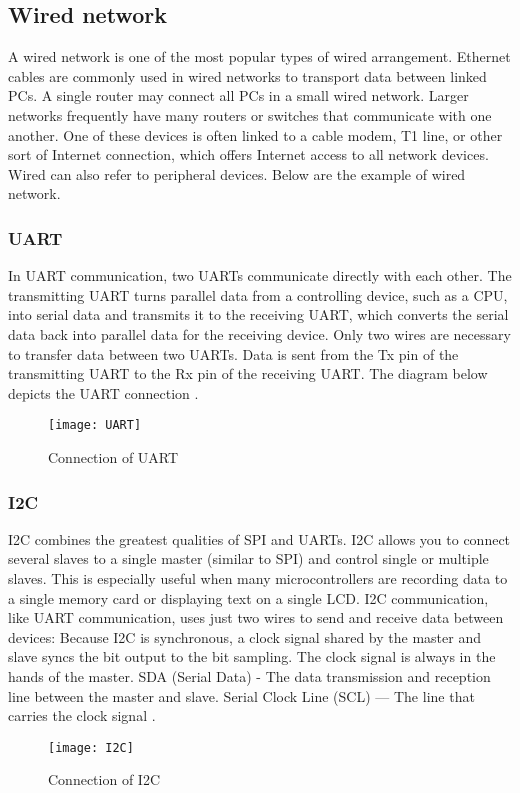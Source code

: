 \subsection{Wired network}
A wired network is one of the most popular types of wired arrangement. Ethernet cables are commonly used in wired networks to transport data between linked PCs. A single router may connect all PCs in a small wired network. Larger networks frequently have many routers or switches that communicate with one another. One of these devices is often linked to a cable modem, T1 line, or other sort of Internet connection, which offers Internet access to all network devices. Wired can also refer to peripheral devices. Below are the example of wired network.

\subsubsection{UART}
In UART communication, two UARTs communicate directly with each other. The transmitting UART turns parallel data from a controlling device, such as a CPU, into serial data and transmits it to the receiving UART, which converts the serial data back into parallel data for the receiving device. Only two wires are necessary to transfer data between two UARTs. Data is sent from the Tx pin of the transmitting UART to the Rx pin of the receiving UART. The diagram below depicts the UART connection \cite{b4}.

\begin{figure}[h]
    \centering
    \texttt{[image: UART]}
    \caption{Connection of UART}
    \label{fig:UART}
\end{figure}

\subsubsection{I2C}
I2C combines the greatest qualities of SPI and UARTs. I2C allows you to connect several slaves to a single master (similar to SPI) and control single or multiple slaves. This is especially useful when many microcontrollers are recording data to a single memory card or displaying text on a single LCD. I2C communication, like UART communication, uses just two wires to send and receive data between devices: Because I2C is synchronous, a clock signal shared by the master and slave syncs the bit output to the bit sampling. The clock signal is always in the hands of the master. SDA (Serial Data) - The data transmission and reception line between the master and slave. Serial Clock Line (SCL) — The line that carries the clock signal \cite{b4}.

\begin{figure}[h]
    \centering
    \texttt{[image: I2C]}
    \caption{Connection of I2C}
    \label{fig:I2C}
\end{figure}

